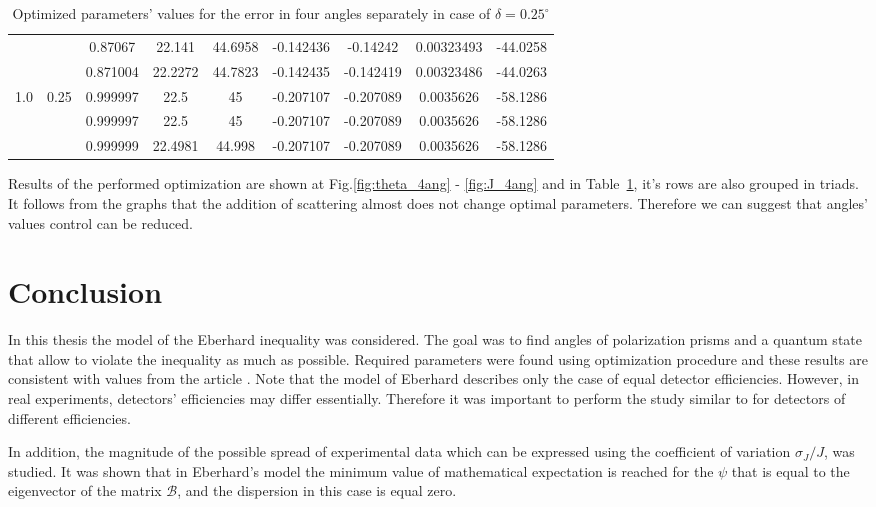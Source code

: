 \documentclass[%
master,         %
subf,           %
href,           %
colorlinks=true %
]{disser}
\numberwithin{equation}{section}
\numberwithin{figure}{section}
\begin{document}
\begin{table}
\begin{tabular}{|c|c|c|c|c|c|c|c|c|}
 &  & 0.87067 & 22.141 & 44.6958 & -0.142436 & -0.14242 & 0.00323493 & -44.0258\\\cline{3-9}
 &  & 0.871004 & 22.2272 & 44.7823 & -0.142435 & -0.142419 & 0.00323486 & -44.0263\\\hline
\multirow{3}{*}{1.0} & \multirow{3}{*}{0.25} & 0.999997 & 22.5 & 45 & -0.207107 & -0.207089 & 0.0035626 & -58.1286\\\cline{3-9}
 &  & 0.999997 & 22.5 & 45 & -0.207107 & -0.207089 & 0.0035626 & -58.1286\\\cline{3-9}
 &  & 0.999999 & 22.4981 & 44.998 & -0.207107 & -0.207089 & 0.0035626 & -58.1286\\\hline
 \end{tabular}
\caption{Optimized parameters' values for the error in four angles separately in case of 
$\delta = 0.25^\circ$}
\label{tab:different_deltas}
\end{table}

Results of the performed optimization are shown at Fig.\ref{fig:theta_4ang} - \ref{fig:J_4ang}  and in  
Table~\ref{tab:different_deltas}, it's rows are also grouped in triads. It follows from the graphs that 
the addition of scattering almost does not change optimal parameters. Therefore we can suggest 
that angles' values control can be reduced.

\clearpage

\section{Conclusion}
In this thesis the model of the Eberhard inequality was considered. The goal was to find angles of polarization prisms and a quantum state that allow to violate the inequality as much as possible. Required parameters were found using optimization procedure and these results are consistent with values from the article \cite{Eberhard}. Note that the model of Eberhard describes only the case of  equal detector efficiencies. However, in real experiments, detectors' efficiencies may differ essentially. Therefore it was important to perform the study similar to \cite{Eberhard} for detectors of different efficiencies.

In addition, the magnitude of the possible spread of experimental data which can be expressed using the coefficient of variation $\sigma_J / J $, was studied. It was shown that in Eberhard's model the minimum value of mathematical expectation is reached for the $\psi$ that is equal to the eigenvector of the matrix $\mathcal{B}$, and the dispersion in this case is equal zero. 
\end{document}
